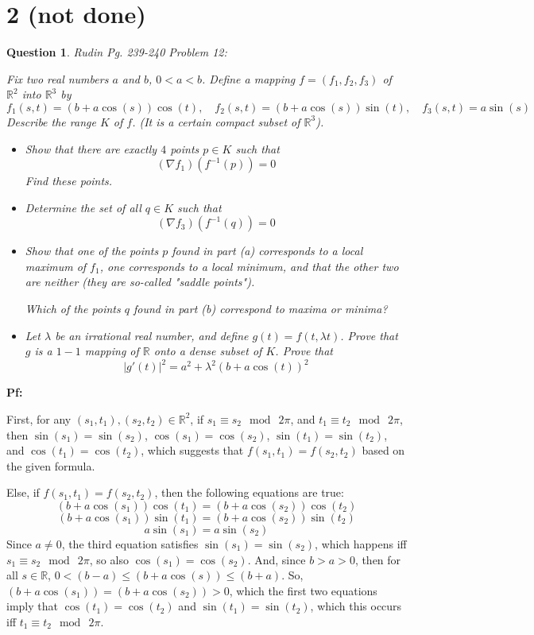 \documentclass{article}
\newtheorem{question}{Question}
\begin{document}
\section*{2 (not done)}
\begin{myBox}[]{}
    \begin{question}
        Rudin Pg. 239-240 Problem 12:

        Fix two real numbers $a$ and $b$, $0<a<b$. Define a mapping $f=(f_1,f_2,f_3)$ of $\mathbb{R}^2$ into $\mathbb{R}^3$ by 
        $$f_1(s,t)=(b+a\cos(s))\cos(t),\quad f_2(s,t)=(b+a\cos(s))\sin(t),\quad f_3(s,t)=a\sin(s)$$
        Describe the range $K$ of $f$. (It is a certain compact subset of $\mathbb{R}^3$).

        \begin{itemize}
            \item[(a)] Show that there are exactly $4$ points $p\in K$ such that 
            $$(\nabla f_1)(f^{-1}(p))=0$$
            Find these points.
            \item[(b)] Determine the set of all $q\in K$ such that 
            $$(\nabla f_3)(f^{-1}(q))=0$$
            \item[(c)] Show that one of the points $p$ found in part (a) corresponds to a local maximum of $f_1$, one corresponds to a local minimum, and that the other two are neither (they are so-called "saddle points").
            
            Which of the points $q$ found in part (b) correspond to maxima or minima?
            \item[(d)] Let $\lambda$ be an irrational real number, and define $g(t)=f(t,\lambda t)$. Prove that $g$ is a $1-1$ mapping of $\mathbb{R}$ onto a dense subset of $K$. Prove that
            $$|g'(t)|^2 = a^2+\lambda^2(b+a\cos(t))^2$$
        \end{itemize}
    \end{question}
\end{myBox}

\textbf{Pf:}

First, for any $(s_1,t_1), (s_2,t_2)\in\mathbb{R}^2$, if $s_1\equiv s_2\mod\ 2\pi$, and $t_1\equiv t_2\mod\ 2\pi$, then $\sin(s_1)=\sin(s_2)$, $\cos(s_1)=\cos(s_2)$, $\sin(t_1)=\sin(t_2)$, and $\cos(t_1)=\cos(t_2)$,
which suggests that $f(s_1,t_1)=f(s_2,t_2)$ based on the given formula.

Else, if $f(s_1,t_1)=f(s_2,t_2)$, then the following equations are true:
$$(b+a\cos(s_1))\cos(t_1)=(b+a\cos(s_2))\cos(t_2)$$
$$(b+a\cos(s_1))\sin(t_1)=(b+a\cos(s_2))\sin(t_2)$$
$$a\sin(s_1)=a\sin(s_2)$$
Since $a\neq 0$, the third equation satisfies $\sin(s_1)=\sin(s_2)$, which happens iff $s_1\equiv s_2\mod\ 2\pi$, so also $\cos(s_1)=\cos(s_2)$.
And, since $b>a>0$, then for all $s\in\mathbb{R}$, $0<(b-a)\leq(b+a\cos(s))\leq (b+a)$. So, $(b+a\cos(s_1))=(b+a\cos(s_2))>0$,
which the first two equations imply that $\cos(t_1)=\cos(t_2)$ and $\sin(t_1)=\sin(t_2)$, which this occurs iff $t_1 \equiv t_2\mod\ 2\pi$.
\end{document}
